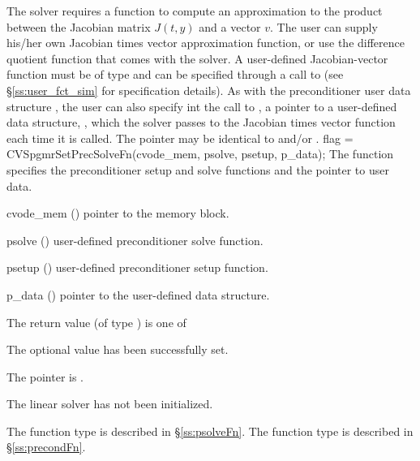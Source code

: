 The 
{\cvspgmr} solver requires a function to compute an approximation to the
product between the Jacobian matrix $J(t,y)$ and a vector $v$.
The user can supply his/her own Jacobian times vector approximation function, 
or use the difference quotient function  
that comes with the {\cvspgmr} solver.
A user-defined Jacobian-vector function must be of type  and 
can be specified through a call to  
(see \S\ref{ss:user_fct_sim} for specification details).
As with the preconditioner user data structure , 
the user can also specify int the call to , a pointer to a 
user-defined data structure, , which
the {\cvspgmr} solver passes to the Jacobian times vector function 
each time it is called.  
The pointer  may be identical to  and/or .
{
  flag = CVSpgmrSetPrecSolveFn(cvode\_mem, psolve, psetup, p\_data);
}
{
  The function  specifies the preconditioner
  setup and solve functions and the pointer to user data.
}
{
  \begin{args}
  \item[cvode\_mem] ()
    pointer to the {\cvode} memory block.
  \item[psolve] ()
    user-defined preconditioner solve function.
  \item[psetup] ()
    user-defined preconditioner setup function.
  \item[p\_data] ()
     pointer to the user-defined data structure.
  \end{args}
}
{
  The return value  (of type ) is one of
  \begin{args}
  \item[\Id{CVSPGMR\_SUCCESS}] 
    The optional value has been successfully set.
  \item[\Id{CVSPGMR\_MEM\_NULL}]
    The  pointer is .
  \item[\Id{CVSPGMR\_LMEM\_NULL}]
    The {\cvspgmr} linear solver has not been initialized.
  \end{args}
}
{
   The function type  is described in \S\ref{ss:psolveFn}.
   The function type  is described in \S\ref{ss:precondFn}.
}
